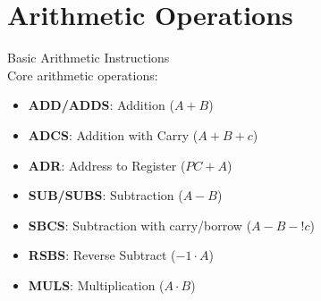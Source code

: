 \section{Arithmetic Operations}



\begin{definition}{Basic Arithmetic Instructions}\\
Core arithmetic operations:
\begin{itemize}
  \item \textbf{ADD/ADDS}: Addition ($A + B$)
  \item \textbf{ADCS}: Addition with Carry ($A + B + c$)
  \item \textbf{ADR}: Address to Register ($PC + A$)
  \item \textbf{SUB/SUBS}: Subtraction ($A - B$)
  \item \textbf{SBCS}: Subtraction with carry/borrow ($A - B - !c$)
  \item \textbf{RSBS}: Reverse Subtract ($-1 \cdot A$)
  \item \textbf{MULS}: Multiplication ($A \cdot B$)
\end{itemize}
\end{definition}

